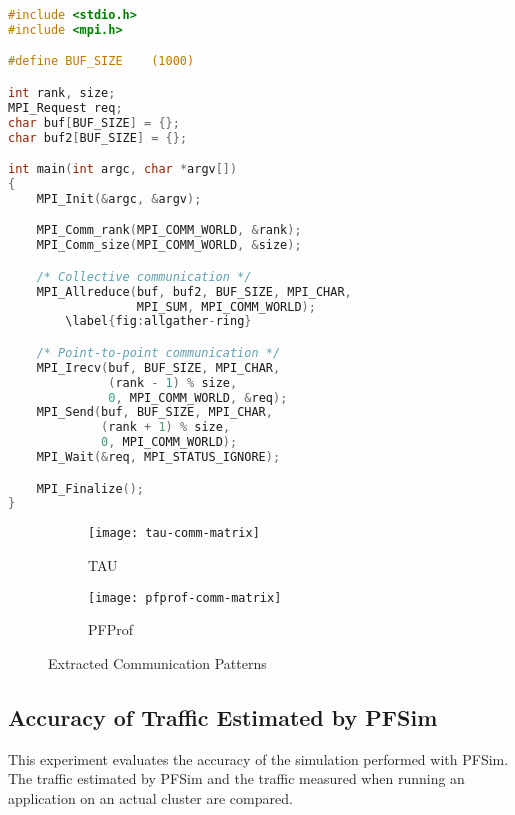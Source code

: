 \begin{lstlisting}[caption={MPI Application Used for Evaluation},
                   label=lst:pfprof-example, float, language=C]
#include <stdio.h>
#include <mpi.h>

#define BUF_SIZE    (1000)

int rank, size;
MPI_Request req;
char buf[BUF_SIZE] = {};
char buf2[BUF_SIZE] = {};

int main(int argc, char *argv[])
{
    MPI_Init(&argc, &argv);

    MPI_Comm_rank(MPI_COMM_WORLD, &rank);
    MPI_Comm_size(MPI_COMM_WORLD, &size);

    /* Collective communication */
    MPI_Allreduce(buf, buf2, BUF_SIZE, MPI_CHAR,
                  MPI_SUM, MPI_COMM_WORLD);
        \label{fig:allgather-ring}

    /* Point-to-point communication */
    MPI_Irecv(buf, BUF_SIZE, MPI_CHAR,
              (rank - 1) % size,
              0, MPI_COMM_WORLD, &req);
    MPI_Send(buf, BUF_SIZE, MPI_CHAR,
             (rank + 1) % size,
             0, MPI_COMM_WORLD);
    MPI_Wait(&req, MPI_STATUS_IGNORE);

    MPI_Finalize();
}
\end{lstlisting}

\begin{figure}
    \centering
    \begin{subfigure}{.49\linewidth}
        \centering
        \texttt{[image: tau-comm-matrix]}
        \caption{TAU}%
        \label{fig:tau-comm-matrix}
    \end{subfigure}
    \begin{subfigure}{.49\linewidth}
        \centering
        \texttt{[image: pfprof-comm-matrix]}
        \caption{PFProf}%
        \label{fig:pfprof-comm-matrix}
    \end{subfigure}
    \caption{Extracted Communication Patterns}%
    \label{fig:profiler-comparison}
\end{figure}

\subsection{Accuracy of Traffic Estimated by PFSim}%
\label{sec:ii-eval-pfsim}

This experiment evaluates the accuracy of the simulation performed with PFSim.
The traffic estimated by PFSim and the traffic measured when running an
application on an actual cluster are compared.


